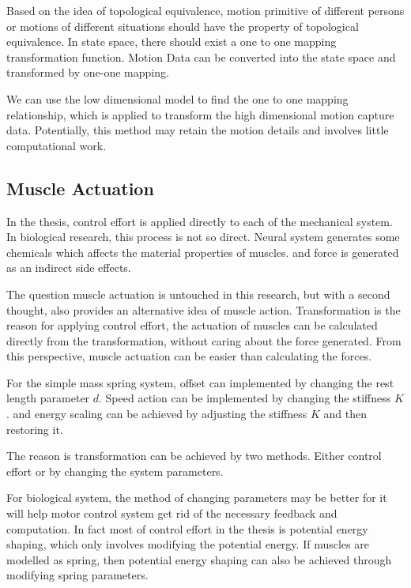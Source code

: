 Based on the idea of topological equivalence, 
motion primitive of different persons or motions of different situations should have the property of topological equivalence.
In state space, there should exist a one to one mapping transformation function.
Motion Data can be converted into the state space and  transformed by one-one mapping.


We can use the low dimensional model to find the one to one mapping relationship, 
which is applied to transform the high dimensional motion capture data.
Potentially, this method may retain the motion details and involves little computational work. 





\subsection{Muscle Actuation}
In the thesis, control effort is applied directly to each \dof of the mechanical system.
In biological research, this process is not so direct.
Neural system generates some chemicals which affects the material properties of muscles.
and force is generated as an indirect side effects.


The question muscle actuation is untouched in this research,
but with a second thought, \moit also provides an alternative idea of muscle action.
Transformation is the reason for applying control effort,
the actuation of muscles can be calculated directly from the transformation, without caring about the force generated.
From this perspective, muscle actuation can be easier than calculating the forces.


For the simple  mass spring system,
offset can implemented by changing the rest length parameter $d$.
Speed action can be implemented by changing the stiffness $K$.
and energy scaling can be achieved by adjusting the stiffness $K$ and then restoring it.
 

The reason is transformation can be achieved by two methods.
Either control effort or by changing the system parameters.

For biological system, the method of changing parameters  may be better for it will help motor control system get rid of the necessary feedback and computation. 
In fact most of control effort in the thesis is potential energy shaping, which only involves  modifying the potential energy.
If muscles are modelled as spring, then potential energy shaping can also be achieved through modifying spring parameters.

